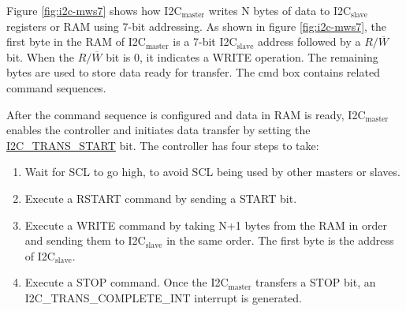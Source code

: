 \documentclass[main\_\_EN.tex]{subfiles}
\begin{document}
Figure \ref{fig:i2c-mws7} shows how I2C$_\text{master}$ writes N bytes of data to I2C$_\text{slave}$ registers or RAM using 7-bit addressing. As shown in figure \ref{fig:i2c-mws7}, the first byte in the RAM of I2C$_\text{master}$ is a 7-bit I2C$_\text{slave}$ address followed by a $R/\overline W$ bit. When the $R/\overline W$ bit is 0, it indicates a WRITE operation. The remaining bytes are used to store data ready for transfer. The cmd box contains related command sequences.

After the command sequence is configured and data in RAM is ready, I2C$_\text{master}$ enables the controller and initiates data transfer by setting the \hyperref[fielddesc:I2CTRANSSTART]{I2C\_TRANS\_START} bit. The controller has four steps to take:
\begin{enumerate}
    \item Wait for SCL to go high, to avoid SCL being used by other masters or slaves.
    \item Execute a RSTART command by sending a START bit.
    \item Execute a WRITE command by taking N+1 bytes from the RAM in order and sending them to I2C$_\text{slave}$ in the same order. The first byte is the address of I2C$_\text{slave}$.
    \item Execute a STOP command. Once the I2C$_\text{master}$ transfers a STOP bit, an I2C\_TRANS\_COMPLETE\_INT interrupt is generated.
\end{enumerate}
\end{document}

